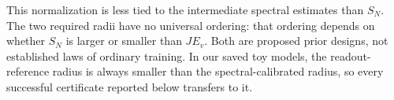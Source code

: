 This normalization is less tied to the intermediate spectral estimates than
$S_N$. The two required radii have no universal ordering: that ordering depends
on whether $S_N$ is larger or smaller than $JE_v$. Both are proposed prior
designs, not established laws of ordinary training. In our saved toy models,
the readout-reference radius is always smaller than the spectral-calibrated
radius, so every successful certificate reported below transfers to it.

